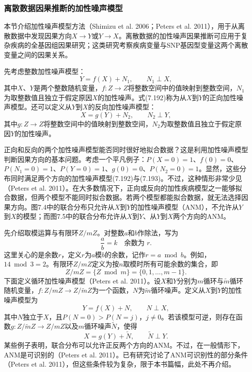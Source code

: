 \subsubsection{离散数据因果推断的加性噪声模型}
本节介绍加性噪声模型方法（Shimizu et al. 2006；Peters et al. 2011），用于从离散数据中发现因果方向$X\to Y$或$Y\to X$。离散数据的加性噪声因果推断可应用于复杂疾病的全基因组因果研究；这类研究考察疾病变量与SNP基因型变量这两个离散变量之间的因果关系。

先考虑整数加性噪声模型：
\begin{equation}
Y=f(X)+N_1,\qquad N_1\perp X,\tag{7.192}
\end{equation}
其中$X$、$Y$是两个整数随机变量，$f:Z\to Z$将整数空间中的值映射到整数空间，$N_1$为取整数值且独立于假定原因$X$的加性噪声。式(7.192)称为从$X$到$Y$的正向加性噪声模型。还可以定义从$Y$到$X$的反向加性噪声模型：
\begin{equation}
X=g(Y)+N_2,\qquad N_2\perp Y,\tag{7.193}
\end{equation}
其中$g:Z\to Z$将整数空间中的值映射到整数空间，$N_2$为取整数值且独立于假定原因$Y$的加性噪声。

正向和反向的两个加性噪声模型能否同时很好地拟合数据？这是利用加性噪声模型判断因果方向的基本问题。考虑一个平凡例子：$P(X=0)=1$、$f(0)=0$、$P(N_1=0)=1$、$P(Y=0)=1$、$g(0)=0$、$P(N_2=0)=1$。显然，这些分布同时满足两个方向的加性噪声模型(7.192)与(7.193)。不过，这种情形非常少见（Peters et al. 2011）。在大多数情况下，正向或反向的加性疾病模型之一能够拟合数据，但两个模型不能同时拟合数据。若两个模型都能拟合数据，就无法选择因果方向。图7.4中的联合分布只允许从$X$到$Y$的加性噪声模型（ANM），不允许从$Y$到$X$的模型；而图7.5中的联合分布允许从$X$到$Y$、从$Y$到$X$两个方向的ANM。

\begin{figure}[htbp]
\centering

\end{figure}

先介绍取模运算与有限环$Z/mZ$。对整数$a$和$b$作除法，写为
\[
\frac ab=k\quad\text{余数为 }r.
\]
这里关心的是余数$r$，定义$r$为$a$模$b$的余数，记作$r=a\bmod b$。例如，$14\bmod3=2$。有限环$Z/mZ$定义为按$n$取模时所有可能余数的集合，即
\[
Z/mZ=\{Z\bmod m\}=\{0,1,\ldots,m-1\}.
\]
下面定义循环加性噪声模型（Peters et al. 2011）。设$X$和$Y$分别为$m$循环与$\widetilde m$循环随机变量，$f:Z/mZ\to Z/\widetilde m Z$为一个函数，$N$为$\widetilde m$循环噪声。定义从$X$到$Y$的加性噪声模型为
\begin{equation}
Y=f(X)+N,\qquad N\perp X,\tag{7.194}
\end{equation}
其中$N$独立于$X$，且$P(N=0)>P(N=j)$，$j\ne0$。若该模型可逆，则存在函数$g:Z/\widetilde m Z\to Z/mZ$以及$m$循环噪声$\widetilde N$，使得
\begin{equation}
X=g(Y)+\widetilde N,\qquad \widetilde N\perp Y.\tag{7.195}
\end{equation}
某些例子表明，联合分布可以允许正反两个方向的ANM。不过，在一般情形下，ANM是可识别的（Peters et al. 2011）。已有研究讨论了ANM可识别性的部分条件（Peters et al. 2011），但这些条件较为复杂，限于本书篇幅，此处不再介绍。

